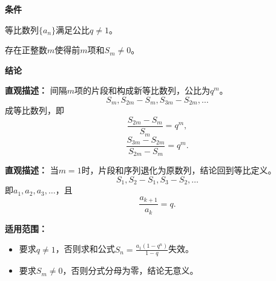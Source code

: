 \begin{statementbox}
	\textbf{\textcolor{CStatement}{条件}}
	\begin{description}[style=nextline, leftmargin=2.8em, labelsep=0.5em, itemsep=0.35em]
		\item[\textbf{\textcolor{CStatement}{条件1（公比限制）：}}] 等比数列$\{a_n\}$满足公比$q\neq 1$。
		\item[\textbf{\textcolor{CStatement}{条件2（非零前m项和）：}}] 存在正整数$m$使得前$m$项和$S_m\neq 0$。
	\end{description}

	\textbf{\textcolor{CStatement}{结论}}
	\begin{description}[style=nextline, leftmargin=2.8em, labelsep=0.5em, itemsep=0.45em]
		\item[\textbf{\textcolor{CStatement}{结论一（片段等比性）：}}]
			\textbf{\textcolor{CStatement}{直观描述：}}
			间隔$m$项的片段和构成新等比数列，公比为$q^m$。
			\[
				S_m, S_{2m}-S_m, S_{3m}-S_{2m},\ldots
			\]
			成等比数列，即
			\[
				\frac{S_{2m}-S_m}{S_m}=q^m,
			\]
			\[
				\frac{S_{3m}-S_{2m}}{S_{2m}-S_m}=q^m.
			\]

		\item[\textbf{\textcolor{CStatement}{推广结论（退化情形）：}}]
			\textbf{\textcolor{CStatement}{直观描述：}}
			当$m=1$时，片段和序列退化为原数列，结论回到等比定义。
			\[
				S_1, S_2-S_1, S_3-S_2,\ldots
			\]
			即$a_1, a_2, a_3,\ldots$，且
			\[
				\frac{a_{k+1}}{a_k}=q.
			\]
	\end{description}

	\textbf{\textcolor{CStatement}{适用范围：}}
	\begin{itemize}[leftmargin=*, itemsep=0.5em, topsep=0.4em]
		\item 要求$q\neq 1$，否则求和公式$S_n=\frac{a_1(1-q^n)}{1-q}$失效。
		\item 要求$S_m\neq 0$，否则分式分母为零，结论无意义。
	\end{itemize}
\end{statementbox}
